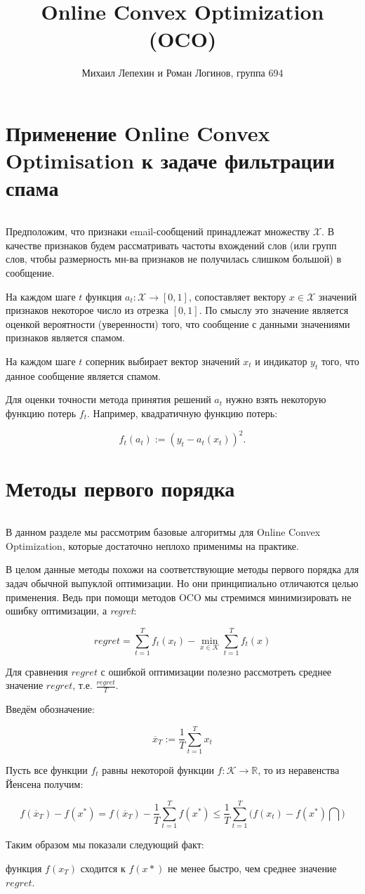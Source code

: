 \documentclass[12pt]{article}
\author{Михаил Лепехин и Роман Логинов, группа 694}
\title{Online Convex Optimization (OCO)}
\begin{document}
  \maketitle

\section*{Применение Online Convex Optimisation к задаче фильтрации спама}
$ $

Предположим, что признаки email-сообщений принадлежат множеству $\mathcal{X}$. В качестве признаков будем рассматривать частоты вхождений слов (или групп слов, чтобы размерность мн-ва признаков не получилась слишком большой) в сообщение.

На каждом шаге $t$ функция $a_t : \mathcal{X} \rightarrow [0, 1]$, сопоставляет вектору $x \in \mathcal{X}$ значений признаков некоторое число из отрезка $[0, 1]$. По смыслу это значение является оценкой вероятности (уверенности) того, что сообщение с данными значениями признаков является спамом.

На каждом шаге $t$ соперник выбирает вектор значений $x_t$ и индикатор $y_t$ того, что данное сообщение является спамом.

Для оценки точности метода принятия решений $a_t$ нужно взять некоторую функцию потерь $f_t$. Например, квадратичную функцию потерь:

$$f_t(a_t) := (y_t-a_t(x_t))^2.$$

\section*{Методы первого порядка}
$ $

В данном разделе мы рассмотрим базовые алгоритмы для Online Convex Optimization, которые достаточно неплохо применимы на практике.

В целом данные методы похожи на соответствующие методы первого порядка для задач обычной выпуклой оптимизации. Но они принципиально отличаются целью применения. Ведь при помощи методов OCO мы стремимся минимизировать не ошибку оптимизации, а \textit{regret}:

$$regret = \sum\limits_{t=1}^T f_t(x_t) - \min\limits_{x \in \mathcal{K}} \sum\limits_{t=1}^T f_t(x)$$

Для сравнения $regret$ с ошибкой оптимизации полезно рассмотреть среднее значение $regret$, т.е. $\frac{regret}{T}$.

Введём обозначение:

$$\overline{x}_T := \frac{1}{T}\sum\limits_{t=1}^T x_t$$

Пусть все функции $f_t$ равны некоторой функции $f : \mathcal{K} \rightarrow \mathbb{R}$, то из неравенства Йенсена получим:

$$f(\overline{x}_T)-f(x^*) = f(\overline{x}_T)- \frac{1}{T} \sum\limits_{t=1}^T f(x^*) \leq \frac{1}{T}\sum\limits_{t=1}^T \big(f(x_t)-   f(x^*)\bigcap)$$

Таким образом мы показали следующий факт: 

функция $f(x_T)$ сходится к $f(x*)$ не менее быстро, чем среднее значение $regret$.
\end{document}
